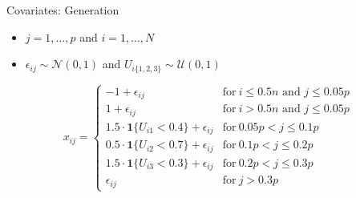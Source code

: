 \documentclass{beamer}
\providecommand{\tightlist}{%
  \setlength{\itemsep}{0pt}\setlength{\parskip}{0pt}}
\begin{document}
\begin{frame}{Covariates: Generation}
\protect\hypertarget{covariates-generation}{}
\begin{itemize}
\tightlist
\item
  \(j = 1, \ldots, p\) and \(i = 1, \ldots, N\)
\item
  \(\epsilon_{ij} \sim \mathcal{N}(0, 1)\) and
  \(U_{i\{1,2,3\}} \sim \mathcal{U}(0, 1)\)
\end{itemize}

\[
x_{ij} = \begin{cases}
-1 + \epsilon_{ij}                                   & \text{for}\ i \leq 0.5n \text{ and } j \leq 0.05p \\
1 + \epsilon_{ij}                                    & \text{for}\ i > 0.5n \text{ and } j \leq 0.05p \\
1.5 \cdot \mathbf{1}\{U_{i1} < 0.4\} + \epsilon_{ij} & \text{for}\ 0.05p < j \leq 0.1p \\
0.5 \cdot \mathbf{1}\{U_{i2} < 0.7\} + \epsilon_{ij} & \text{for}\ 0.1p < j \leq 0.2p \\
1.5 \cdot \mathbf{1}\{U_{i3} < 0.3\} + \epsilon_{ij} & \text{for}\ 0.2p < j \leq 0.3p \\
\epsilon_{ij}                                        & \text{for}\ j > 0.3p
\end{cases}
\]
\end{frame}
\end{document}
